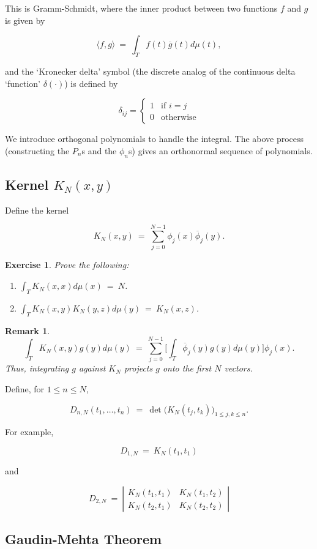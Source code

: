 \documentclass[12pt,letterpaper]{report}
\newcommand\be{\begin{equation}}
\newcommand\ee{\end{equation}}
\newcommand\ben{\begin{enumerate}}
\newcommand\een{\end{enumerate}}
\newtheorem{exe}[thm]{Exercise}
\newtheorem{rek}[thm]{Remark}
\newcommand{\twocase}[5]{#1 \begin{cases} #2 & \text{#3}\\ #4
&\text{#5} \end{cases}   }
\begin{document}
This is Gramm-Schmidt, where the inner product between two
functions $f$ and $g$ is given by

\be \langle f, g \rangle \ = \ \int_T f(t) \overline{g}(t)
d\mu(t), \ee

and the `Kronecker delta' symbol (the discrete analog of the
continuous delta `function' $\delta(\cdot)$) is defined by

\be \twocase{ \delta_{ij} = }{1}{if $i = j$}{0}{otherwise} \ee

We introduce orthogonal polynomials to handle the integral. The
above process (constructing the $P_n$s and the $\phi_n$s) gives an
orthonormal sequence of polynomials.

\subsection{Kernel $K_N(x,y)$}

Define the kernel

\be K_N(x,y) \ = \ \sum_{j=0}^{N-1} \phi_j(x)
\overline{\phi}_j(y). \ee

\begin{exe} Prove the following:
\ben
\item $\int_T K_N(x,x)d\mu(x) \ = \ N$.
\item $\int_T K_N(x,y) K_N(y,z) d\mu(y) \ = \ K_N(x,z)$.
\een
\end{exe}


\begin{rek}
\be \int_T K_N(x,y) g(y) d\mu(y) \ = \ \sum_{j=0}^{N-1} \Big[
\int_T \overline{\phi}_j(y) g(y) d\mu(y) \Big] \phi_j(x). \ee
Thus, integrating $g$ against $K_N$ projects $g$ onto the first
$N$ vectors.
\end{rek}

Define, for $1 \le n \le N$,

\be D_{n,N}(t_1,\dots,t_n) \ = \ \det \Big( K_N(t_j,t_k) \Big)_{1
\le j,k \le n}. \ee

For example,

\be D_{1,N} \ = \ K_N(t_1,t_1) \ee

and

\be D_{2,N} \ = \ \left|\begin{array}{cc}
                         K_N(t_1,t_1) & K_N(t_1,t_2)   \\
                         K_N(t_2,t_1) & K_N(t_2,t_2)
                          \end{array}\right|
\ee


\subsection{Gaudin-Mehta Theorem}
\end{document}
